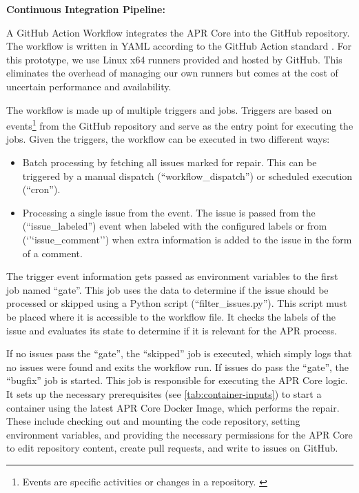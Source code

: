 \textbf{Continuous Integration Pipeline:}

A GitHub Action Workflow integrates the APR Core into the GitHub repository. The workflow is written in YAML according to the GitHub Action standard \cite{WorkflowSyntaxGitHub}. For this prototype, we use Linux x64 runners provided and hosted by GitHub. This eliminates the overhead of managing our own runners but comes at the cost of uncertain performance and availability.

The workflow is made up of multiple triggers and jobs. Triggers are based on events\footnote{Events are specific activities or changes in a repository. \cite{GitHubEventTypes}} from the GitHub repository and serve as the entry point for executing the jobs. Given the triggers, the workflow can be executed in two different ways:

\begin{itemize}
    \item Batch processing by fetching all issues marked for repair. This can be triggered by a manual dispatch (``workflow\_dispatch'') or scheduled execution (``cron'').
    \item Processing a single issue from the event. The issue is passed from the (``issue\_labeled'') event when labeled with the configured labels or from (`'`issue\_comment'') when extra information is added to the issue in the form of a comment.
\end{itemize}

The trigger event information gets passed as environment variables to the first job named ``gate''. This job uses the data to determine if the issue should be processed or skipped using a Python script (``filter\_issues.py''). This script must be placed where it is accessible to the workflow file. It checks the labels of the issue and evaluates its state to determine if it is relevant for the APR process.

If no issues pass the ``gate'', the ``skipped'' job is executed, which simply logs that no issues were found and exits the workflow run. If issues do pass the ``gate'', the ``bugfix'' job is started. This job is responsible for executing the APR Core logic. It sets up the necessary prerequisites (see \ref{tab:container-inputs}) to start a container using the latest APR Core Docker Image, which performs the repair. These include checking out and mounting the code repository, setting environment variables, and providing the necessary permissions for the APR Core to edit repository content, create pull requests, and write to issues on GitHub.


